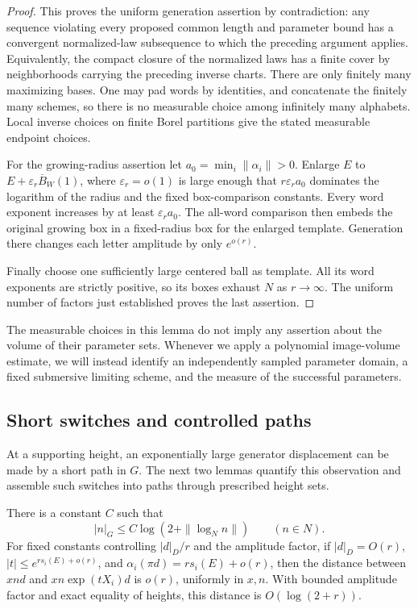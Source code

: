 \begin{proof}
This proves the uniform generation assertion by contradiction:
any sequence violating every proposed common length and parameter
bound has a convergent normalized-law subsequence to which the
preceding argument applies. Equivalently, the compact closure of
the normalized laws has a finite cover by neighborhoods carrying
the preceding inverse charts. There are only finitely many
maximizing bases. One may pad words by identities, and concatenate
the finitely many schemes, so there is no measurable choice among
infinitely many alphabets. Local inverse choices on finite Borel
partitions give the stated measurable endpoint choices.

For the growing-radius assertion let
$a_0=\min_i\|\alpha_i\|>0$. Enlarge $E$ to
$E+\varepsilon_r\overline B_W(1)$, where $\varepsilon_r=o(1)$ is
large enough that $r\varepsilon_ra_0$ dominates the logarithm of
the radius and the fixed box-comparison constants. Every word
exponent increases by at least $\varepsilon_ra_0$. The all-word
comparison then embeds the original growing box in a fixed-radius
box for the enlarged template. Generation there changes each letter
amplitude by only $e^{o(r)}$.

Finally choose one sufficiently large centered ball as template.
All its word exponents are strictly positive, so its boxes exhaust
$N$ as $r\to\infty$. The uniform number of factors just established
proves the last assertion.
\end{proof}

The measurable choices in this lemma do not imply any assertion
about the volume of their parameter sets. Whenever we apply a
polynomial image-volume estimate, we will instead identify an
independently sampled parameter domain, a fixed submersive limiting
scheme, and the measure of the successful parameters.

\subsection{Short switches and controlled paths}

At a supporting height, an exponentially large generator displacement
can be made by a short path in $G$. The next two lemmas quantify this
observation and assemble such switches into paths through prescribed
height sets.

\begin{lemma}\label{lem:log-distortion}
There is a constant $C$ such that
\[
 |n|_G\le C\log(2+\|\log_Nn\|)\qquad(n\in N).
\]
For fixed constants controlling $|d|_D/r$ and the amplitude factor,
if $|d|_D=O(r)$,
$|t|\le e^{rs_i(E)+o(r)}$, and
$\alpha_i(\pi d)=rs_i(E)+o(r)$, then the distance between
$xnd$ and $xn\exp(tX_i)d$ is $o(r)$, uniformly in $x,n$.
With bounded amplitude factor and exact equality of heights, this
distance is $O(\log(2+r))$.
\end{lemma}

